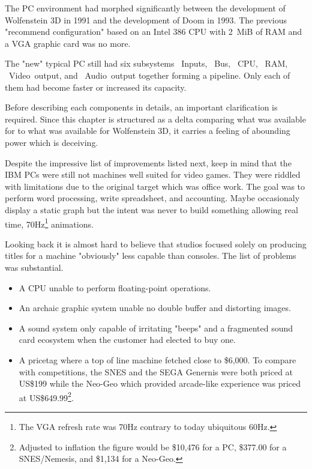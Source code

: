 The PC environment had morphed significantly between the development of Wolfenstein 3D in 1991 and the development of Doom in 1993. The previous "recommend configuration" based on an Intel 386 CPU with 2~MiB of RAM and a VGA graphic card was no more.\\
\par
The "new" typical PC still had six subsystems ~Inputs, ~Bus, ~CPU, ~RAM, ~Video~output, and ~Audio~output together forming a pipeline. Only each of them had become faster or increased its capacity.\\
\par
\vspace{2mm}
\par
 Before describing each components in details, an important clarification is required. Since this chapter is structured as a delta comparing what was available for \doom to what was available for Wolfenstein 3D, it carries a feeling of abounding power which is deceiving. \\
 \par
 Despite the impressive list of improvements listed next, keep in mind that the IBM PCs were still not machines well suited for video games. They were riddled with limitations due to the original target which was office work. The goal was to perform word processing, write spreadsheet, and accounting. Maybe occasionaly display a static graph but the intent was never to build something allowing real time, 70Hz\footnote{The VGA refresh rate was 70Hz contrary to today ubiquitous 60Hz.} animations.\\ 
\par 
Looking back it is almost hard to believe that studios focused solely on producing titles for a machine "obviously" less capable than consoles. The list of problems was substantial.
\begin{itemize}
\item A CPU unable to perform floating-point operations.
\item An archaic graphic system unable no double buffer and distorting images.
\item A sound system only capable of irritating "beeps" and a fragmented sound card ecosystem when the customer had elected to buy one.
\item A pricetag where a top of line machine fetched close to \$6,000. To compare with competitions, the SNES and the SEGA Genernis were both priced at US\$199 while the Neo-Geo which provided arcade-like experience was priced at US\$649.99\footnote{Adjusted to inflation the figure would be \$10,476 for a PC, \$377.00 for a SNES/Nemesis, and \$1,134 for a Neo-Geo.}.
\end{itemize}
